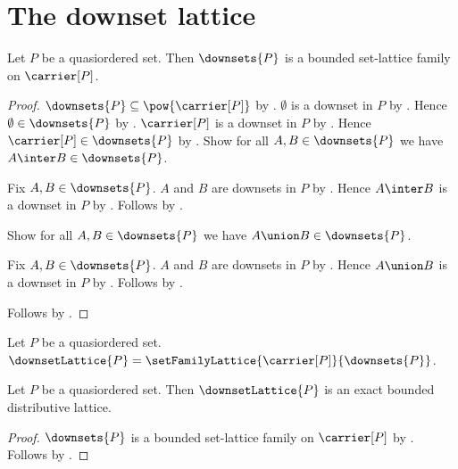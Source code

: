 \section{The downset lattice}




\begin{theorem}\label{downsets_are_bounded_set_lattice_family}
    Let $P$ be a quasiordered set.
    Then $\downsets{P}$ is a bounded set-lattice family on $\carrier[P]$.
\end{theorem}
\begin{proof}
    $\downsets{P}\subseteq\pow{\carrier[P]}$ by
        .
    $\emptyset$ is a downset in $P$ by .
    Hence $\emptyset\in\downsets{P}$ by .
    $\carrier[P]$ is a downset in $P$ by .
    Hence $\carrier[P]\in\downsets{P}$ by .
    Show for all $A,B\in\downsets{P}$ we have
        $A\inter B\in\downsets{P}$.
    \begin{subproof}
        Fix $A,B\in\downsets{P}$.
        $A$ and $B$ are downsets in $P$ by .
        Hence $A\inter B$ is a downset in $P$ by .
        Follows by .
    \end{subproof}
    Show for all $A,B\in\downsets{P}$ we have
        $A\union B\in\downsets{P}$.
    \begin{subproof}
        Fix $A,B\in\downsets{P}$.
        $A$ and $B$ are downsets in $P$ by .
        Hence $A\union B$ is a downset in $P$ by .
        Follows by .
    \end{subproof}
    Follows by .
\end{proof}

\begin{definition}\label{downset_lattice}
    Let $P$ be a quasiordered set.
    $\downsetLattice{P}=
        \setFamilyLattice{\carrier[P]}{\downsets{P}}$.
\end{definition}

\begin{theorem}\label{downset_lattice_is_exact_bounded_distributive_lattice}
    Let $P$ be a quasiordered set.
    Then $\downsetLattice{P}$ is an exact bounded distributive lattice.
\end{theorem}
\begin{proof}
    $\downsets{P}$ is a bounded set-lattice family on $\carrier[P]$ by
        .
    Follows by
        .
\end{proof}

